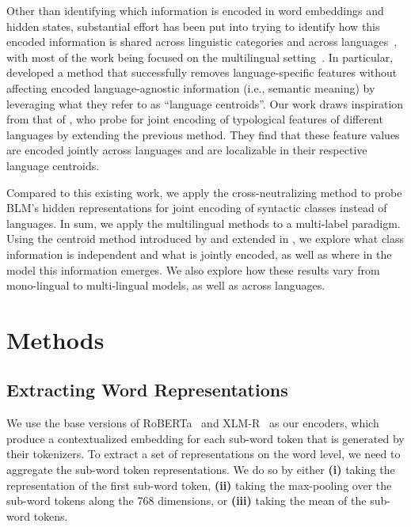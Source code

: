 \documentclass[11pt,a4paper]{article}
\begin{document}
Other than identifying which information is encoded in word embeddings and hidden states, substantial effort has been put into trying to identify how this encoded information is shared across linguistic categories and across languages~\citep{sahin_linspector_2020, blevins_deep_2018}, with most of the work being focused on the multilingual setting~\citep{chi_finding_2020}. In particular, \citet{libovicky_language_2020} developed a method that successfully removes language-specific features without affecting encoded language-agnostic information (i.e., semantic meaning) by leveraging what they refer to as ``language centroids''. Our work draws inspiration from that of \citet{choenni_investigating_2022}, who probe for joint encoding of typological features of different languages by extending the previous method. They find that these feature values are encoded jointly across languages and are localizable in their respective language centroids.

Compared to this existing work, we apply the cross-neutralizing method to probe BLM's hidden representations for joint encoding of syntactic classes instead of languages. In sum, we apply the multilingual methods to a multi-label paradigm. Using the centroid method introduced by \citet{libovicky_language_2020} and extended in \citet{choenni_investigating_2022}, we explore what class information is independent and what is jointly encoded, as well as where in the model this information emerges. We also explore how these results vary from mono-lingual to multi-lingual models, as well as across languages.

\section{Methods}
\label{sec:methods}

\subsection{Extracting Word Representations}
\label{extracting-word-representations}
We use the base versions of RoBERTa~\citep{liu_roberta_2019} and XLM-R~\citep{conneau_unsupervised_2020} as our encoders, which produce a contextualized embedding for each sub-word token that is generated by their tokenizers. To extract a set of representations on the word level, we need to aggregate the sub-word token representations. We do so by either \textbf{(i)} taking the representation of the first sub-word token, \textbf{(ii)} taking the max-pooling over the sub-word tokens along the 768 dimensions, or \textbf{(iii)} taking the mean of the sub-word tokens.
\end{document}
